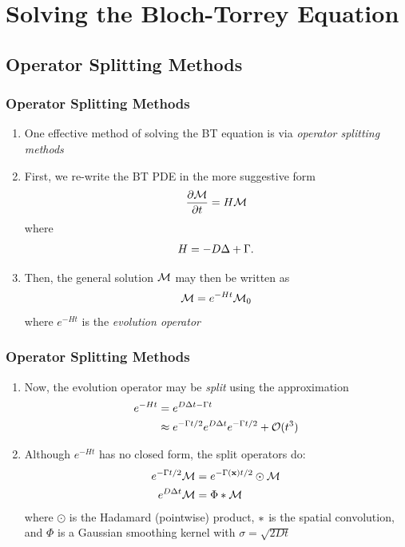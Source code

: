 \begin{frame}

\end{frame}


\section{Solving the Bloch-Torrey Equation}


\subsection{Operator Splitting Methods}

\begin{frame}
\frametitle{Operator Splitting Methods}
\begin{enumerate}
    \item One effective method of solving the BT equation is via \textit{operator splitting methods}
    \item First, we re-write the BT PDE in the more suggestive form
    $$ \frac{\partial \mathcal{M}}{\partial t} = H \mathcal{M} $$
    where
    \begin{gather*}
        H = -D \mbox{$\Delta$}{} + \Gamma.
    \end{gather*}
    \item Then, the general solution $\mathcal{M}$ may then be written as
    $$ \mathcal{M} = e^{-Ht}\mathcal{M}_0 $$
    where $e^{-Ht}$ is the \textit{evolution operator}
\end{enumerate}
\end{frame}

\begin{frame}
\frametitle{Operator Splitting Methods}
\begin{enumerate}
    \item Now, the evolution operator may be \textit{split} using the approximation %
    \begin{align*}
        e^{-Ht} &= e^{D \Delta t - \Gamma t} \\
        &\approx e^{-\Gamma t/2} e^{D \Delta t} e^{-\Gamma t/2} + \mathcal{O}(t^3)
    \end{align*}
    \item Although $e^{-Ht}$ has no closed form, the split operators do:
    \begin{align*}
        e^{-\Gamma t/2} \mathcal{M} &= e^{-\Gamma(\mathbf{x}) t/2} \odot \mathcal{M} \\
        e^{D \Delta t} \mathcal{M} &= \Phi \ast \mathcal{M}
    \end{align*}
    where $\odot$ is the Hadamard (pointwise) product, $\ast$ is the spatial convolution, and $\Phi$ is a Gaussian smoothing kernel with $\sigma = \sqrt{2Dt}$
\end{enumerate}
\end{frame}

